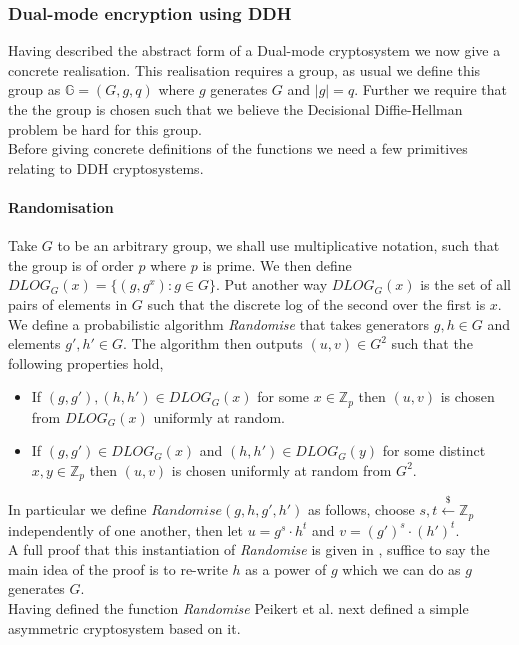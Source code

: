\documentclass[ %
                    author={Nicholas Tutte},
                supervisor={Prof. Nigel Smart},
                    degree={MEng},
                     title={Secure Two Party Computation},
                  subtitle={A practical comparison of recent protocols},
                      type={Research - GG1K},
                      year={2015} ]{dissertation}
\begin{document}
				\subsubsection{Dual-mode encryption using DDH}

					Having described the abstract form of a Dual-mode cryptosystem we now give a concrete realisation. This realisation requires a group, as usual we define this group as $\mathbb{G} = (G, g, q)$ where $g$ generates $G$ and $|g| = q$. Further we require that the the group is chosen such that we believe the Decisional Diffie-Hellman problem be hard for this group.\\

					Before giving concrete definitions of the functions we need a few primitives relating to DDH cryptosystems.\\
					
					\paragraph{Randomisation} Take $G$ to be an arbitrary group, we shall use multiplicative notation, such that the group is of order $p$ where $p$ is prime. We then define $DLOG_G(x) = \{ (g, g^x) : g \in G\}$. Put another way $DLOG_G(x)$ is the set of all pairs of elements in $G$ such that the discrete log of the second over the first is $x$.\\
					
					We define a probabilistic algorithm \emph{Randomise} that takes generators $g,h \in G$ and elements $g', h' \in G$. The algorithm then outputs $(u, v) \in G^2$ such that the following properties hold,
					
					\begin{itemize}
						\item If $(g, g'), (h, h') \in DLOG_G(x)$ for some $x \in \mathbb{Z}_p$ then $(u, v)$ is chosen from $DLOG_G(x)$ uniformly at random.

						\item If $(g, g')\in DLOG_G(x)$ and $(h, h') \in DLOG_G(y)$ for some distinct $x, y \in \mathbb{Z}_p$ then $(u, v)$ is chosen uniformly at random from $G^2$.
					\end{itemize}
					In particular we define $Randomise(g, h, g', h')$ as follows, choose $s, t \xleftarrow{\$} \mathbb{Z}_p$ independently of one another, then let $u = g^s \cdot h^t$ and $v = (g')^s \cdot (h')^t$.\\
					A full proof that this instantiation of \emph{Randomise} is given in \cite{PVW_OT_2008}, suffice to say the main idea of the proof is to re-write $h$ as a power of $g$ which we can do as $g$ generates $G$.\\
					Having defined the function \emph{Randomise} Peikert et al. next defined a simple asymmetric cryptosystem based on it.
\end{document}
